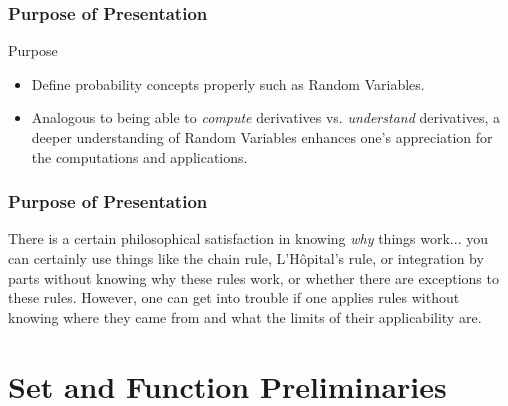 \documentclass{beamer}
\begin{document}
\begin{frame}
\frametitle{Purpose of Presentation}
\begin{block}{Purpose}
  \begin{itemize}
    \item<2-> Define probability concepts properly such as Random Variables.
    \item<3-> Analogous to being able to \emph{compute} derivatives vs. \emph{understand} derivatives, a deeper understanding of Random Variables enhances one's appreciation for the computations and applications.
  \end{itemize}
\end{block}
\end{frame}

\begin{frame}
\frametitle{Purpose of Presentation}
\begin{block}{\parencite[pp.~2-3]{analysis_tao}}
  There is a certain philosophical satisfaction in knowing \emph{why} things work... you can certainly use things like the chain rule, L'H\^{o}pital's rule, or integration by parts without knowing why these rules work, or whether there are exceptions to these rules. However, one can get into trouble if one applies rules without knowing where they came from and what the limits of their applicability are.
\end{block}
\end{frame}


\section{Set and Function Preliminaries}

\end{document}
